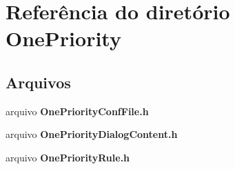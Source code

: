 \section{Referência do diretório One\+Priority}
\label{dir_77ea14302bcef40f3ce6aca2d0a2c436}
\subsection*{Arquivos}
\begin{DoxyCompactItemize}
\item 
arquivo {\bf One\+Priority\+Conf\+File.\+h}
\item 
arquivo {\bf One\+Priority\+Dialog\+Content.\+h}
\item 
arquivo {\bf One\+Priority\+Rule.\+h}
\end{DoxyCompactItemize}
